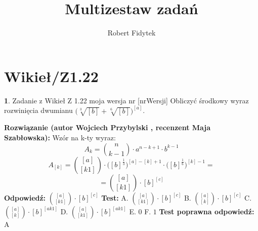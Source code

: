 \documentclass[12pt, a4paper]{article}
\title{Multizestaw zadań}
\author{Robert Fidytek}
\date{}
\theoremstyle{definition} %
\newtheorem{zad}{}
\newcommand{\kategoria}[1]{\section{#1}} %
\newcommand{\zadStart}[1]{\begin{zad}#1\newline} %
\newcommand{\zadStop}{\end{zad}}   %
\newcommand{\rozwStart}[2]{\noindent \textbf{Rozwiązanie (autor #1 , recenzent #2): }\newline} %
\newcommand{\rozwStop}{\newline}                                            %
\newcommand{\odpStart}{\noindent \textbf{Odpowiedź:}\newline}    %
\newcommand{\odpStop}{\newline}                                             %
\newcommand{\testStart}{\noindent \textbf{Test:}\newline} %
\newcommand{\testStop}{\newline} %
\newcommand{\kluczStart}{\noindent \textbf{Test poprawna odpowiedź:}\newline} %
\newcommand{\kluczStop}{\newline} %
\begin{document}
\maketitle


\kategoria{Wikieł/Z1.22}
\zadStart{Zadanie z Wikieł Z 1.22  moja wersja nr [nrWersji]}
Obliczyć środkowy wyraz rozwinięcia dwumianu $\bigg(\sqrt[3]{[b]}+\sqrt[6]{[b]}\bigg)^{[a]}$.
\zadStop
\rozwStart{Wojciech Przybylski}{Maja Szabłowska}
Wzór na k-ty wyraz:
$$A_{k}={n\choose k-1}\cdot a^{n-k+1}\cdot b^{k-1}$$
$$A_{[k]}={[a]\choose [k1]}\cdot \big([b]^{\frac{1}{3}}\big)^{[a]-[k]+1}\cdot \big([b]^{\frac{1}{6}}\big)^{[k]-1}=$$
$$={[a]\choose [k1]}\cdot [b]^{[c]}$$
\rozwStop
\odpStart
${[a]\choose [k1]}\cdot [b]^{[c]}$
\odpStop
\testStart
A. ${[a]\choose [k1]}\cdot [b]^{[c]}$
B. ${[a]\choose [k]}\cdot [b]^{[c]}$
C. ${[a]\choose [k]}\cdot [b]^{[ak1]}$
D. ${[a]\choose [k1]}\cdot [b]^{[ak1]}$
E. $0$
F. $1$
\testStop
\kluczStart
A
\kluczStop
\end{document}
